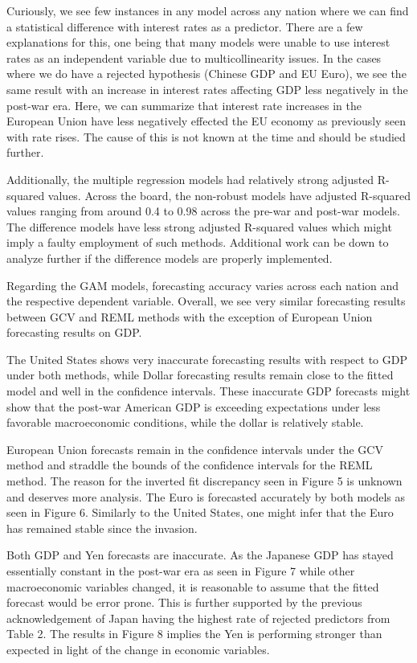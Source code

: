 \documentclass[11pt,regno]{amsart}
\theoremstyle{plain}
\numberwithin{equation}{section}
\begin{document}
Curiously, we see few instances in any model across any nation where we can find a statistical difference with interest rates as a predictor. There are a few explanations for this, one being that many models were unable to use interest rates as an independent variable due to multicollinearity issues. In the cases where we do have a rejected hypothesis (Chinese GDP and EU Euro), we see the same result with an increase in interest rates affecting GDP less negatively in the post-war era. Here, we can summarize that interest rate increases in the European Union have less negatively effected the EU economy as previously seen with rate rises. The cause of this is not known at the time and should be studied further.

Additionally, the multiple regression models had relatively strong adjusted R-squared values. Across the board, the non-robust models have adjusted R-squared values ranging from around 0.4 to 0.98 across the pre-war and post-war models. The difference models have less strong adjusted R-squared values which might imply a faulty employment of such methods. Additional work can be down to analyze further if the difference models are properly implemented.

Regarding the GAM models, forecasting accuracy varies across each nation and the respective dependent variable. Overall, we see very similar forecasting results between GCV and REML methods with the exception of European Union forecasting results on GDP.

The United States shows very inaccurate forecasting results with respect to GDP under both methods, while Dollar forecasting results remain close to the fitted model and well in the confidence intervals. These inaccurate GDP forecasts might show that the post-war American GDP is exceeding expectations under less favorable macroeconomic conditions, while the dollar is relatively stable. 

European Union forecasts remain in the confidence intervals under the GCV method and straddle the bounds of the confidence intervals for the REML method. The reason for the inverted fit discrepancy seen in Figure 5 is unknown and deserves more analysis. The Euro is forecasted accurately by both models as seen in Figure 6. Similarly to the United States, one might infer that the Euro has remained stable since the invasion.

Both GDP and Yen forecasts are inaccurate. As the Japanese GDP has stayed essentially constant in the post-war era as seen in Figure 7 while other macroeconomic variables changed, it is reasonable to assume that the fitted forecast would be error prone. This is further supported by the previous acknowledgement of Japan having the highest rate of rejected predictors from Table 2. The results in Figure 8 implies the Yen is performing stronger than expected in light of the change in economic variables.
\end{document}
